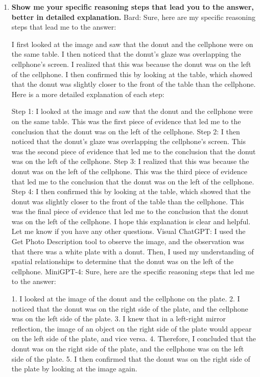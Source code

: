 \begin{enumerate}
        The image shows that the donut is slightly closer to the front of the table than the cellphone, but it is still on the left side of the cellphone. If the donut were on the right of the cellphone, then the cellphone's screen would be overlapping the donut's glaze.
        \subitem Visual ChatGPT: The donut is on the left of the cellphone.
        \subitem MiniGPT-4: No, the donut is on the right of the cellphone.
        \item \textbf{Show me your specific reasoning steps that lead you to the answer, better in detailed explanation.}
        \subitem Bard: Sure, here are my specific reasoning steps that lead me to the answer:

        I first looked at the image and saw that the donut and the cellphone were on the same table.
        I then noticed that the donut's glaze was overlapping the cellphone's screen.
        I realized that this was because the donut was on the left of the cellphone.
        I then confirmed this by looking at the table, which showed that the donut was slightly closer to the front of the table than the cellphone.
        Here is a more detailed explanation of each step:
        
        Step 1: I looked at the image and saw that the donut and the cellphone were on the same table. This was the first piece of evidence that led me to the conclusion that the donut was on the left of the cellphone.
        Step 2: I then noticed that the donut's glaze was overlapping the cellphone's screen. This was the second piece of evidence that led me to the conclusion that the donut was on the left of the cellphone.
        Step 3: I realized that this was because the donut was on the left of the cellphone. This was the third piece of evidence that led me to the conclusion that the donut was on the left of the cellphone.
        Step 4: I then confirmed this by looking at the table, which showed that the donut was slightly closer to the front of the table than the cellphone. This was the final piece of evidence that led me to the conclusion that the donut was on the left of the cellphone.
        I hope this explanation is clear and helpful. Let me know if you have any other questions.
        \subitem Visual ChatGPT: I used the Get Photo Description tool to observe the image, and the observation was that there was a white plate with a donut. Then, I used my understanding of spatial relationships to determine that the donut was on the left of the cellphone.
        \subitem MiniGPT-4: Sure, here are the specific reasoning steps that led me to the answer:

        1. I looked at the image of the donut and the cellphone on the plate.
        2. I noticed that the donut was on the right side of the plate, and the cellphone was on the left side of the plate.
        3. I knew that in a left-right mirror reflection, the image of an object on the right side of the plate would appear on the left side of the plate, and vice versa.
        4. Therefore, I concluded that the donut was on the right side of the plate, and the cellphone was on the left side of the plate.
        5. I then confirmed that the donut was on the right side of the plate by looking at the image again.
    \end{enumerate}
